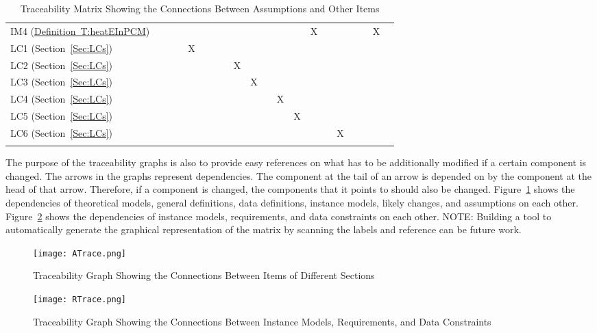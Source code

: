 \documentclass[12pt]{article}
\begin{document}
\begin{longtable}{l l l l l l l l l l l l l l l l l l l l}
\\
IM4 (\hyperref[T:heatEInPCM]{Definition~T:heatEInPCM}) &  &  &  &  &  &  &  &  &  &  &  &  & X &  &  &  &  & X & 
\\
LC1 (Section~\ref{Sec:LCs}) &  &  &  & X &  &  &  &  &  &  &  &  &  &  &  &  &  &  & 
\\
LC2 (Section~\ref{Sec:LCs}) &  &  &  &  &  &  &  & X &  &  &  &  &  &  &  &  &  &  & 
\\
LC3 (Section~\ref{Sec:LCs}) &  &  &  &  &  &  &  &  & X &  &  &  &  &  &  &  &  &  & 
\\
LC4 (Section~\ref{Sec:LCs}) &  &  &  &  &  &  &  &  &  &  & X &  &  &  &  &  &  &  & 
\\
LC5 (Section~\ref{Sec:LCs}) &  &  &  &  &  &  &  &  &  &  &  & X &  &  &  &  &  &  & 
\\
LC6 (Section~\ref{Sec:LCs}) &  &  &  &  &  &  &  &  &  &  &  &  &  &  & X &  &  &  & 
\\
\bottomrule
\caption{Traceability Matrix Showing the Connections Between Assumptions and Other Items}
\label{Table:Tracey3}
\end{longtable}
The purpose of the traceability graphs is also to provide easy references on what has to be additionally modified if a certain component is changed. The arrows in the graphs represent dependencies. The component at the tail of an arrow is depended on by the component at the head of that arrow. Therefore, if a component is changed, the components that it points to should also be changed. Figure~\ref{Figure:TraceyA} shows the dependencies of theoretical models, general definitions, data definitions, instance models, likely changes, and assumptions on each other. Figure~\ref{Figure:TraceyR} shows the dependencies of instance models, requirements, and data constraints on each other.
NOTE: Building a tool to automatically generate the graphical representation of the matrix by scanning the labels and reference can be future work.
\begin{figure}
\begin{center}
\texttt{[image: ATrace.png]}
\caption{Traceability Graph Showing the Connections Between Items of Different Sections}
\label{Figure:TraceyA}
\end{center}
\end{figure}
\begin{figure}
\begin{center}
\texttt{[image: RTrace.png]}
\caption{Traceability Graph Showing the Connections Between Instance Models, Requirements, and Data Constraints}
\label{Figure:TraceyR}
\end{center}
\end{figure}
\end{document}
